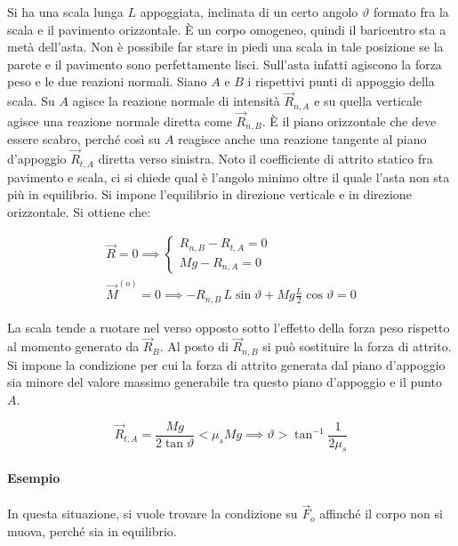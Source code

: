\FloatBarrier
Si ha una scala lunga $L$ appoggiata, inclinata di un certo angolo $\vartheta$ formato fra la scala e il pavimento orizzontale. È un corpo omogeneo, quindi il baricentro sta a metà dell'asta. Non è possibile far stare in piedi una scala in tale posizione se la parete e il pavimento sono perfettamente lisci. Sull'asta infatti agiscono la forza peso e le due reazioni normali. Siano $A$ e $B$ i rispettivi punti di appoggio della scala. Su $A$ agisce la reazione normale di intensità $\vec{R}_{n,A}$ e su quella verticale agisce una reazione normale diretta come $\vec{R}_{n,B}$. È il piano orizzontale che deve essere scabro, perché così su $A$ reagisce anche una reazione tangente al piano d'appoggio $\vec{R}_{t,A}$ diretta verso sinistra. Noto il coefficiente di attrito statico fra pavimento e scala, ci si chiede qual è l'angolo minimo oltre il quale l'asta non sta più in equilibrio.
Si impone l'equilibrio in direzione verticale e in direzione orizzontale. Si ottiene che:

\begin{gather*}
	\vec{R} = 0 \implies \left\{ \begin{array}{l}
	 	R_{n,B}-R_{t,A} = 0 \\
		Mg-R_{n,A} = 0
	\end{array} \right. \\
	\vec{M}^{(o)} = 0 \implies -R_{n,B}\,L\sin \vartheta + Mg\frac{L}{2}\cos \vartheta = 0
\end{gather*}

La scala tende a ruotare nel verso opposto sotto l'effetto della forza peso rispetto al momento generato da $\vec{R}_B$. Al posto di $\vec{R}_{n,B}$ si può sostituire la forza di attrito. Si impone la condizione per cui la forza di attrito generata dal piano d'appoggio sia minore del valore massimo generabile tra questo piano d'appoggio e il punto $A$.

\[
	\vec{R}_{t,A}= \frac{Mg}{2\tan \vartheta } < \mu_s Mg \implies \vartheta > \tan^{-1} \frac{1}{2\mu_s}
\]

\paragraph{Esempio} In questa situazione, si vuole trovare la condizione su $\vec{F}_o$ affinché il corpo non si muova, perché sia in equilibrio.

